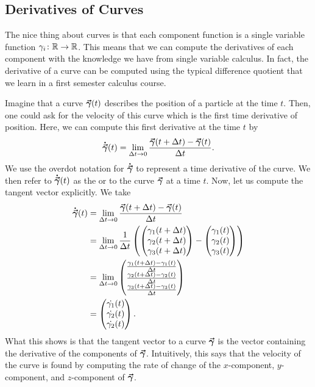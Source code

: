         \subsection{Derivatives of Curves}
        
        The nice thing about curves is that each component function is a single variable function $\gamma_i\colon \mathbb{R} \to \mathbb{R}$. This means that we can compute the derivatives of each component with the knowledge we have from single variable calculus. In fact, the derivative of a curve can be computed using the typical difference quotient that we learn in a first semester calculus course.  
        
        Imagine that a curve $\boldsymbol{\vec{\gamma}}(t)$ describes the position of a particle at the time $t$.  Then, one could ask for the velocity of this curve which is the first time derivative of position.  Here, we can compute this first derivative at the time $t$ by
        \[
        \boldsymbol{\dot{\vec{\gamma}}}(t) = \lim_{\Delta t \to 0} \frac{\boldsymbol{\vec{\gamma}}(t+\Delta t)-\boldsymbol{\vec{\gamma}}(t)}{\Delta t}.
        \]
        We use the overdot notation for $\boldsymbol{\dot{\vec{\gamma}}}$ to represent a time derivative of the curve.  We then refer to $\boldsymbol{\dot{\vec{\gamma}}}(t)$ as the   or   to the curve $\boldsymbol{\vec{\gamma}}$ at a time $t$. Now, let us compute the tangent vector explicitly.  We take
        \begin{align*}
        	\boldsymbol{\dot{\vec{\gamma}}}(t) &= \lim_{\Delta t \to 0} \frac{\boldsymbol{\vec{\gamma}}(t+\Delta t)-\boldsymbol{\vec{\gamma}}(t)}{\Delta t}\\
        	&= \lim_{\Delta t \to 0} \frac{1}{\Delta t} \left( \begin{pmatrix} \gamma_1(t+\Delta t) \\ \gamma_2(t+\Delta t) \\ \gamma_3(t+\Delta t) \end{pmatrix} - \begin{pmatrix} \gamma_1(t) \\ \gamma_2(t) \\ \gamma_3(t) \end{pmatrix}\right)\\
        	&= \lim_{\Delta t \to 0} \begin{pmatrix} \frac{ \gamma_1(t+\Delta t)-\gamma_1(t)}{\Delta t} \\ \frac{ \gamma_2(t+\Delta t)-\gamma_2(t)}{\Delta t} \\ \frac{ \gamma_3(t+\Delta t)-\gamma_3(t)}{\Delta t} \end{pmatrix}\\
        	&= \begin{pmatrix} \dot{\gamma_1}(t) \\  \dot{\gamma_2}(t) \\ \dot{\gamma_2}(t) \end{pmatrix}.
        \end{align*}
        What this shows is that the tangent vector to a curve $\boldsymbol{\vec{\gamma}}$ is the vector containing the derivative of the components of $\boldsymbol{\vec{\gamma}}$.  Intuitively, this says that the velocity of the curve is found by computing the rate of change of the $x$-component, $y$-component, and $z$-component of $\boldsymbol{\vec{\gamma}}$. 
        
